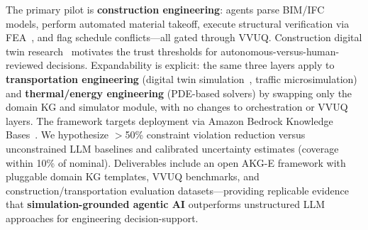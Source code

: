 \documentclass[conference, 10pt]{IEEEtran}
\begin{document}
The primary pilot is \textbf{construction engineering}: agents parse BIM/IFC~\cite{Eastman2011BIM} models, perform automated material takeoff, execute structural verification via FEA~\cite{Logg2012FEniCS}, and flag schedule conflicts---all gated through VVUQ. Construction digital twin research~\cite{Soman2025ConstructionDT} motivates the trust thresholds for autonomous-versus-human-reviewed decisions. Expandability is explicit: the same three layers apply to \textbf{transportation engineering} (digital twin simulation~\cite{Tao2019DigitalTwin}, traffic microsimulation) and \textbf{thermal/energy engineering} (PDE-based solvers) by swapping only the domain KG and simulator module, with no changes to orchestration or VVUQ layers. The framework targets deployment via Amazon Bedrock Knowledge Bases~\cite{AWSBedrockHybridSearch2024}. We hypothesize $>$50\% constraint violation reduction versus unconstrained LLM baselines and calibrated uncertainty estimates (coverage within 10\% of nominal). Deliverables include an open AKG-E framework with pluggable domain KG templates, VVUQ benchmarks, and construction/transportation evaluation datasets---providing replicable evidence that \textbf{simulation-grounded agentic AI} outperforms unstructured LLM approaches for engineering decision-support.



\end{document}
